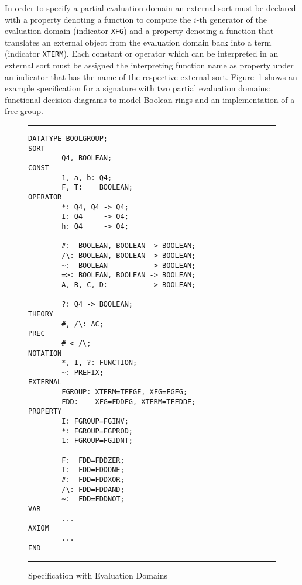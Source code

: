 In order to specify a partial evaluation domain an external sort must be 
declared with a property denoting a function to compute the $i$-th generator
of the evaluation domain (indicator \texttt{XFG}) and a property denoting
a function that translates an external object from the evaluation domain
back into a term (indicator \texttt{XTERM}).
Each constant or operator which can be interpreted in an external sort must 
be assigned the interpreting function name as property under an indicator that
has the name of the respective external sort.
Figure~\ref{fi:ed} shows an example specification for a signature with two
partial evaluation domains: functional decision diagrams 
to model Boolean rings and an implementation of a free group.
\begin{figure}[htbp]
\begin{center}
\noindent
\rule{\textwidth}{0.6pt}

\begin{verbatim}
DATATYPE BOOLGROUP;
SORT
        Q4, BOOLEAN;
CONST
        1, a, b: Q4;
        F, T:    BOOLEAN;
OPERATOR
        *: Q4, Q4 -> Q4;
        I: Q4     -> Q4;
        h: Q4     -> Q4;

        #:  BOOLEAN, BOOLEAN -> BOOLEAN;
        /\: BOOLEAN, BOOLEAN -> BOOLEAN;
        ~:  BOOLEAN          -> BOOLEAN;
        =>: BOOLEAN, BOOLEAN -> BOOLEAN;
        A, B, C, D:          -> BOOLEAN;

        ?: Q4 -> BOOLEAN;
THEORY
        #, /\: AC;
PREC
        # < /\;
NOTATION
        *, I, ?: FUNCTION;
        ~: PREFIX;
EXTERNAL
        FGROUP: XTERM=TFFGE, XFG=FGFG;
        FDD:    XFG=FDDFG, XTERM=TFFDDE;
PROPERTY
        I: FGROUP=FGINV;
        *: FGROUP=FGPROD;
        1: FGROUP=FGIDNT;

        F:  FDD=FDDZER;
        T:  FDD=FDDONE;
        #:  FDD=FDDXOR;
        /\: FDD=FDDAND;
        ~:  FDD=FDDNOT;
VAR
        ...
AXIOM 
        ...
END
\end{verbatim}
 
\noindent
\rule{\textwidth}{0.6pt}
\caption{Specification with Evaluation Domains}
\label{fi:ed}
\end{center}
\end{figure}

